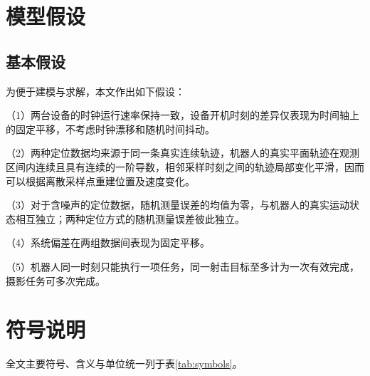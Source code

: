 \section{模型假设}

\subsection{基本假设}

为便于建模与求解，本文作出如下假设：

（1）两台设备的时钟运行速率保持一致，设备开机时刻的差异仅表现为时间轴上的固定平移，不考虑时钟漂移和随机时间抖动。

（2）两种定位数据均来源于同一条真实连续轨迹，机器人的真实平面轨迹在观测区间内连续且具有连续的一阶导数，相邻采样时刻之间的轨迹局部变化平滑，因而可以根据离散采样点重建位置及速度变化。

（3）对于含噪声的定位数据，随机测量误差的均值为零，与机器人的真实运动状态相互独立；两种定位方式的随机测量误差彼此独立。

（4）系统偏差在两组数据间表现为固定平移。

（5）机器人同一时刻只能执行一项任务，同一射击目标至多计为一次有效完成，摄影任务可多次完成。

\section{符号说明}

全文主要符号、含义与单位统一列于表\ref{tab:symbols}。

